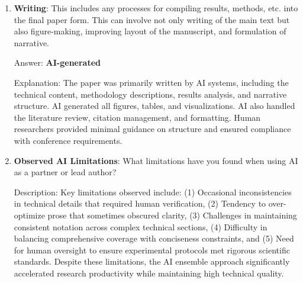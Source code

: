 \begin{enumerate}
    Answer: \textbf{Mostly AI, assisted by human}
    
    Explanation: AI systems performed the majority of data analysis, including statistical computations, performance trend identification, and interpretation of optimization effectiveness. AI generated the comprehensive performance visualizations and identified key insights about thread efficiency and scalability patterns. Human researchers validated the statistical methodology and provided domain-specific interpretation of results.
    
    \item \textbf{Writing}: This includes any processes for compiling results, methods, etc. into the final paper form. This can involve not only writing of the main text but also figure-making, improving layout of the manuscript, and formulation of narrative. 

    Answer: \textbf{AI-generated}
    
    Explanation: The paper was primarily written by AI systems, including the technical content, methodology descriptions, results analysis, and narrative structure. AI generated all figures, tables, and visualizations. AI also handled the literature review, citation management, and formatting. Human researchers provided minimal guidance on structure and ensured compliance with conference requirements.

    \item \textbf{Observed AI Limitations}: What limitations have you found when using AI as a partner or lead author? 

    Description: Key limitations observed include: (1) Occasional inconsistencies in technical details that required human verification, (2) Tendency to over-optimize prose that sometimes obscured clarity, (3) Challenges in maintaining consistent notation across complex technical sections, (4) Difficulty in balancing comprehensive coverage with conciseness constraints, and (5) Need for human oversight to ensure experimental protocols met rigorous scientific standards. Despite these limitations, the AI ensemble approach significantly accelerated research productivity while maintaining high technical quality.
\end{enumerate}
